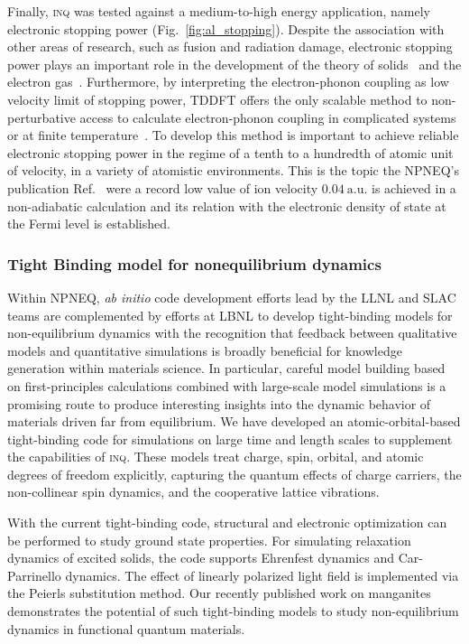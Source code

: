 Finally, \textsc{inq} was tested against a medium-to-high energy application, namely electronic stopping power (Fig.~\ref{fig:al_stopping}). 
Despite the association with other areas of research, such as fusion and radiation damage, electronic stopping power plays an important role in the development of the theory of solids~\cite{Thomson1912, Darwin1912, Bohr1913} and the electron gas~\cite{Lindhard1964}.
Furthermore, by interpreting the electron-phonon coupling as low velocity limit of stopping power, TDDFT offers the only scalable method to non-perturbative access to calculate electron-phonon coupling in complicated systems or at finite temperature~\cite{Caro2015}. 
To develop this method is important to achieve reliable electronic stopping power in the regime of a tenth to a hundredth of atomic unit of velocity, in a variety of atomistic environments. 
This is the topic the NPNEQ's publication Ref.~\cite{Quashie2020} were a record low value of ion velocity \(0.04~\mathrm{a.u.}\) is achieved in a non-adiabatic calculation and its relation with the electronic density of state at the Fermi level is established.

\subsubsection{Tight Binding model for nonequilibrium dynamics}\label{sec:tight-binding}

Within NPNEQ, \emph{ab initio} code development efforts lead by the LLNL and SLAC teams are complemented by efforts at LBNL to develop tight-binding models for non-equilibrium dynamics with the recognition that feedback between qualitative models and quantitative simulations is broadly beneficial for knowledge generation within materials science. 
In particular, careful model building based on first-principles calculations combined with large-scale model simulations is a promising route to produce interesting insights into the dynamic behavior of  materials driven far from equilibrium. 
We have developed an atomic-orbital-based tight-binding code for simulations on large time and length scales to supplement the capabilities of \textsc{inq}. 
These models treat charge, spin, orbital, and atomic degrees of freedom explicitly, capturing the quantum effects of charge carriers, the non-collinear spin dynamics, and the cooperative lattice vibrations. 

With the current tight-binding code, structural and electronic optimization can be performed to study ground state properties. 
For simulating relaxation dynamics of excited solids, the code supports Ehrenfest dynamics and Car-Parrinello dynamics. 
The effect of linearly polarized light field is implemented via the Peierls substitution method. 
Our recently published work on manganites~\cite{Rajpurohit2021} demonstrates the potential of such tight-binding models to study non-equilibrium dynamics in functional quantum materials. 

